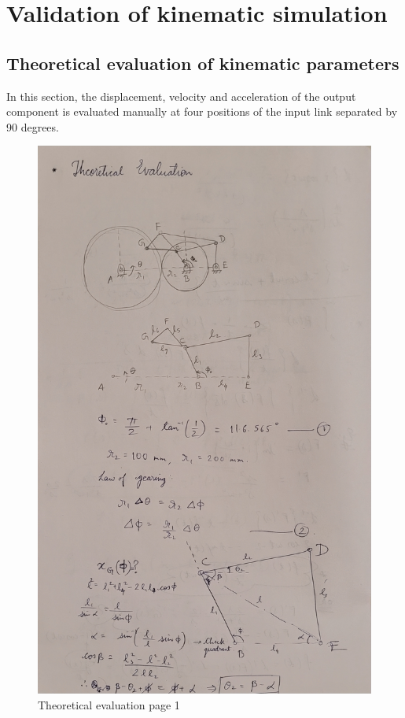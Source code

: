 \section{Validation of kinematic simulation}
    \subsection{Theoretical evaluation of kinematic parameters}
        In this section, the displacement, velocity and acceleration of the output component is evaluated manually at four positions of the input link separated by 90 degrees. 

        \begin{figure}[hbt!]
            \centering
            \includegraphics[width=0.9\columnwidth]{Images/Theo_eval1.jpg}
            \caption{Theoretical evaluation page 1}
            \label{fig:theo_eval1}
        \end{figure}

